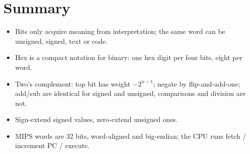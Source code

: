 \section{Summary}
\begin{itemize}
  \item Bits only acquire meaning from interpretation; the same word can be unsigned, signed, text or code.
  \item Hex is a compact notation for binary: one hex digit per four bits, eight per word.
  \item Two's complement: top bit has weight $-2^{n-1}$; negate by flip-and-add-one; add/sub are
        identical for signed and unsigned, comparisons and division are not.
  \item Sign-extend signed values, zero-extend unsigned ones.
  \item MIPS words are 32 bits, word-aligned and big-endian; the CPU runs fetch / increment PC / execute.
\end{itemize}
